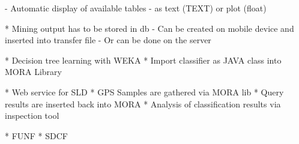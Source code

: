 \documentclass[times, 10pt,twocolumn]{article}
\begin{document}
  - Automatic display of available tables
    - as text (TEXT) or plot (float)

* Mining output has to be stored in db
  - Can be created on mobile device and inserted into transfer file
  - Or can be done on the server


* Decision tree learning with WEKA
* Import classifier as JAVA class into MORA Library

* Web service for SLD
* GPS Samples are gathered via MORA lib
* Query results are inserted back into MORA
* Analysis of classification results via inspection tool


* FUNF
* SDCF


\nocite{ex1,ex2}


\end{document}
